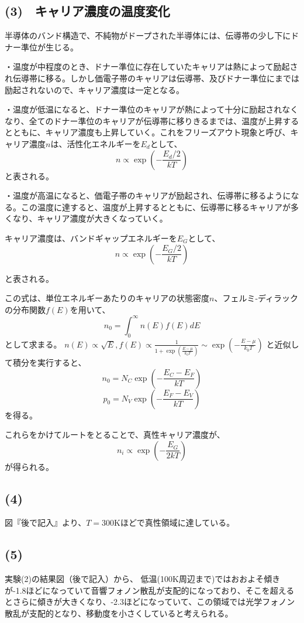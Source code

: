 \documentclass[dvipdfmx]{jsarticle}
\begin{document}
\subsection*{(3)　キャリア濃度の温度変化}
半導体のバンド構造で、不純物がドープされた半導体には、伝導帯の少し下にドナー準位が生じる。

・温度が中程度のとき、ドナー準位に存在していたキャリアは熱によって励起され伝導帯に移る。しかし価電子帯のキャリアは伝導帯、及びドナー準位にまでは励起されないので、キャリア濃度は一定となる。

・温度が低温になると、ドナー準位のキャリアが熱によって十分に励起されなくなり、全てのドナー準位のキャリアが伝導帯に移りきるまでは、温度が上昇するとともに、キャリア濃度も上昇していく。これをフリーズアウト現象と呼び、キャリア濃度$n$は、活性化エネルギーを$E_{d}$として、
\[n \propto \exp{(-\frac{E_{d}/2}{kT})}\]
と表される。

・温度が高温になると、価電子帯のキャリアが励起され、伝導帯に移るようになる。この温度に達すると、温度が上昇するとともに、伝導帯に移るキャリアが多くなり、キャリア濃度が大きくなっていく。

キャリア濃度は、バンドギャップエネルギーを$E_{G}$として、
\[n \propto \exp{(-\frac{E_{G}/2}{kT})}\]

と表される。

この式は、単位エネルギーあたりのキャリアの状態密度$n$、フェルミ-ディラックの分布関数$f(E)$を用いて、
\[n_{0} = \int _{0} ^{\infty} n(E)f(E)dE\]
として求まる。
$n(E) \propto \sqrt{E}, f(E) \propto \frac{1}{1+\exp{\left(\frac{E-\mu}{k_{0}T}\right)}} \sim \exp{\left(-\frac{E-\mu}{k_{0}T}\right)}$
と近似して積分を実行すると、
\[n_{0} = N_{C}\exp{\left(-\frac{E_{C}-E_{F}}{kT}\right)}\]
\[p_{0} = N_{V}\exp{\left(-\frac{E_{F}-E_{V}}{kT}\right)}\]
を得る。

これらをかけてルートをとることで、真性キャリア濃度が、
\[n_{i} \propto \exp{\left(-\frac{E_{G}}{2kT}\right)}\]
が得られる。
\subsection*{(4)}
図『後で記入』より、$T = 300$Kほどで真性領域に達している。
\subsection*{(5)}
実験(2)の結果図（後で記入）から、
低温(100K周辺まで)ではおおよそ傾きが-1.8ほどになっていて音響フォノン散乱が支配的になっており、そこを超えるとさらに傾きが大きくなり、-2.3ほどになっていて、この領域では光学フォノン散乱が支配的となり、移動度を小さくしていると考えられる。
\end{document}
